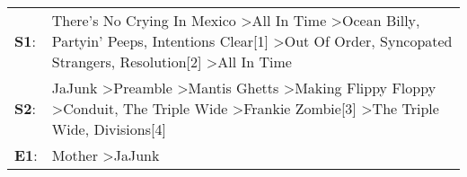 \begin{supertabular}{p{0.03\textwidth}p{0.92\textwidth}}
 \textbf{S1}:  &  There's No Crying In Mexico\textsuperscript{} \textgreater \enspace All In Time\textsuperscript{} \textgreater \enspace Ocean Billy\textsuperscript{}, \enspace Partyin' Peeps\textsuperscript{}, \enspace Intentions Clear[1]\textsuperscript{} \textgreater \enspace Out Of Order\textsuperscript{}, \enspace Syncopated Strangers\textsuperscript{}, \enspace Resolution[2]\textsuperscript{} \textgreater \enspace All In Time\textsuperscript{}  \enspace  \\
 \textbf{S2}:  &   JaJunk\textsuperscript{} \textgreater \enspace Preamble\textsuperscript{} \textgreater \enspace Mantis Ghetts\textsuperscript{} \textgreater \enspace Making Flippy Floppy\textsuperscript{} \textgreater \enspace Conduit\textsuperscript{}, \enspace The Triple Wide\textsuperscript{} \textgreater \enspace Frankie Zombie[3]\textsuperscript{} \textgreater \enspace The Triple Wide\textsuperscript{}, \enspace Divisions[4]\textsuperscript{}  \enspace  \\
 \textbf{E1}:  &                                                                                                                                                                                                                                                                                                                                                                               Mother\textsuperscript{} \textgreater \enspace JaJunk\textsuperscript{}  \enspace  \\
\end{supertabular}
